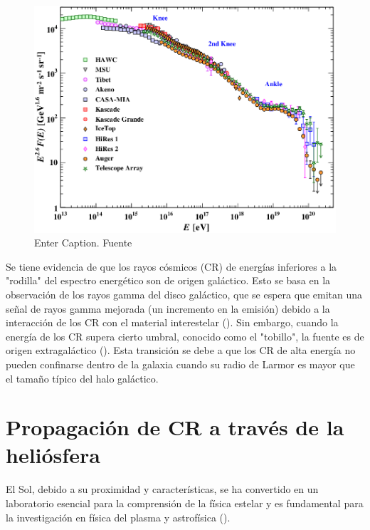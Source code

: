 \begin{figure}
    \centering
    \includegraphics[width=0.8\linewidth]{Figs/CR_spectrum.png}
    \caption{Enter Caption. Fuente \cite{PDG}}
    \label{fig:spectrum}
\end{figure}

Se tiene evidencia de que los rayos cósmicos (CR) de energías inferiores a la "rodilla" del espectro energético son de origen galáctico. Esto se basa en la observación de los rayos gamma del disco galáctico, que se espera que emitan una señal de rayos gamma mejorada (un incremento en la emisión) debido a la interacción de los CR con el material interestelar (\cite{Cristofari_2023}). Sin embargo, cuando la energía de los CR supera cierto umbral, conocido como el "tobillo", la fuente es de origen extragaláctico (\cite{augerextra}). Esta transición se debe a que los CR de alta energía no pueden confinarse dentro de la galaxia cuando su radio de Larmor es mayor que el tamaño típico del halo galáctico.

\section{Propagación de CR a través de la heliósfera}

El Sol, debido a su proximidad y características, se ha convertido en un laboratorio esencial para la comprensión de la física estelar y es fundamental para la investigación en física del plasma y astrofísica (\cite{Rozelot_2006}). %

